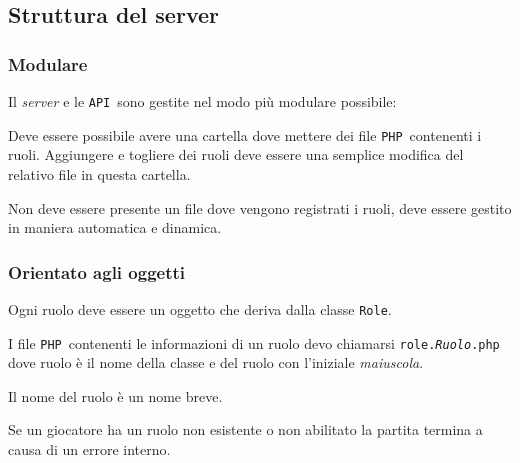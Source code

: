 \documentclass[10pt,a4paper]{article}
\newcommand{\lang}[1]{\texttt{#1}}
\newcommand{\PHP}{\lang{PHP}}
\newcommand{\API}{\texttt{API}}
\begin{document}
\subsection{Struttura del server}

\subsubsection*{Modulare}
Il \emph{server} e le \API\ sono gestite nel modo più modulare possibile:

Deve essere possibile avere una cartella dove mettere dei file \PHP\ contenenti i ruoli. Aggiungere e togliere dei ruoli deve essere una semplice modifica del relativo file in questa cartella. 

Non deve essere presente un file dove vengono registrati i ruoli, deve essere gestito in maniera automatica e dinamica.

\subsubsection*{Orientato agli oggetti}
Ogni ruolo deve essere un oggetto che deriva dalla classe \texttt{Role}.

I file \PHP\ contenenti le informazioni di un ruolo devo chiamarsi \texttt{role.\textit{Ruolo}.php} dove ruolo è il nome della classe e del ruolo con l'iniziale \emph{maiuscola}.

Il nome del ruolo è un nome breve.

Se un giocatore ha un ruolo non esistente o non abilitato la partita termina a causa di un errore interno.
\end{document}
